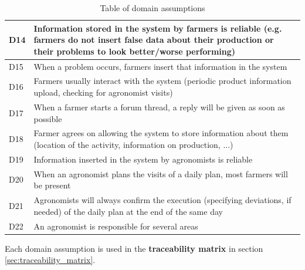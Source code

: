\begin{table}[H]
\begin{tabular}{|l|m{}|}
        \hline
        \hline
        \hline
        
        \textsc{D14}  &    Information stored in the system by farmers is reliable (e.g. farmers do not insert false data about their production or their problems to look better/worse performing)\\
        \hline
        \textsc{D15}  &    When a problem occurs, farmers insert that information in the system\\
        \hline
        \textsc{D16}  &    Farmers usually interact with the system (periodic product information upload, checking for agronomist visits) \\
        \hline
        \textsc{D17}     &   When a farmer starts a forum thread, a reply will be given as soon as possible \\
        \hline
        \textsc{D18}  &    Farmer agrees on allowing the system to store information about them (location of the activity, information on production, ...)\\
        \hline
        
        
        \hline
        \hline
        \hline
    
        \textsc{D19}  &    Information inserted in the system by agronomists is reliable\\
        \hline
        \textsc{D20}  &    When an agronomist plans the visits of a daily plan, most farmers will be present\\
        \hline
        \textsc{D21}  &    Agronomists will always confirm the execution (specifying deviations, if needed) of the daily plan at the end of the same day\\
        \hline
        \textsc{D22}  &    An agronomist is responsible for several areas\\
        \hline
        
        
        
       
        
        
    \end{tabular}
    
    \caption{\label{tab:domainAssumptions}Table of domain assumptions}
    
\end{table}

Each domain assumption is used in the \textbf{traceability matrix} in section \ref{sec:traceability_matrix}.
